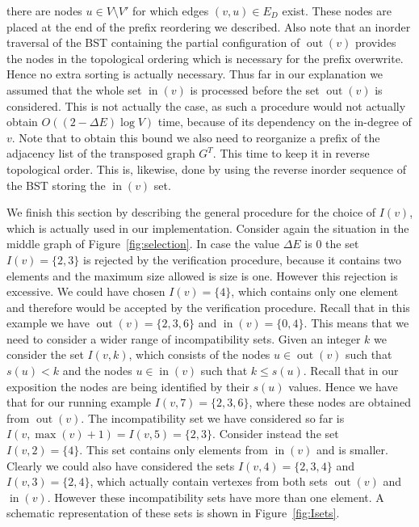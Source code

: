 \documentclass[a4paper]{article}
\DeclareMathOperator{\inn}{in}
\DeclareMathOperator{\out}{out}
\begin{document}
there are nodes $u \in V \setminus V'$ for which edges $(v, u) \in E_D$
exist. These nodes are placed at the end of the prefix reordering we
described. Also note that an inorder traversal of the BST containing the
partial configuration of $\out(v)$ provides the nodes in the topological
ordering which is necessary for the prefix overwrite. Hence no extra
sorting is actually necessary. Thus far in our explanation we assumed that
the whole set $\inn(v)$ is processed before the set $\out(v)$ is
considered. This is not actually the case, as such a procedure would not
actually obtain $O((2 - \Delta E) \log V)$ time, because of its dependency
on the in-degree of $v$. Note that to obtain this bound we also need to
reorganize a prefix of the adjacency list of the transposed graph
$G^T$. This time to keep it in reverse topological order. This is, likewise,
done by using the reverse inorder sequence of the BST storing the $\inn(v)$
set.

We finish this section by describing the general procedure for the choice
of $I(v)$, which is actually used in our implementation. Consider again the
situation in the middle graph of Figure~\ref{fig:selection}. In case the
value $\Delta E$ is $0$ the set $I(v) = \{ 2, 3 \}$ is rejected by the
verification procedure, because it contains two elements and the maximum
size allowed is size is one. However this rejection is excessive. We could
have chosen $I(v) = \{ 4 \}$, which contains only one element and therefore
would be accepted by the verification procedure. Recall that in this
example we have $\out(v) = \{2, 3, 6\}$ and $\inn(v) = \{ 0, 4\}$. This
means that we need to consider a wider range of incompatibility sets. Given
an integer $k$ we consider the set $I(v, k)$, which consists of the nodes
$u \in \out(v)$ such that $s(u) < k$ and the nodes $u \in \inn(v)$ such
that $k \leq s(u)$. Recall that in our exposition the nodes are being
identified by their $s(u)$ values. Hence we have that for our running
example $I(v, 7) = \{ 2, 3, 6\}$, where these nodes are obtained from
$\out(v)$. The incompatibility set we have considered so far is
$I(v, \max(v)+1) = I(v, 5) = \{2, 3 \}$. Consider instead the set
$I(v, 2) = \{ 4 \}$. This set contains only elements from $\inn(v)$ and is
smaller. Clearly we could also have considered the sets
$I(v, 4) = \{ 2, 3, 4\}$ and $I(v, 3) = \{ 2, 4\}$, which actually contain
vertexes from both sets $\out(v)$ and $\inn(v)$. However these
incompatibility sets have more than one element. A schematic representation
of these sets is shown in Figure~\ref{fig:Isets}.
\end{document}
